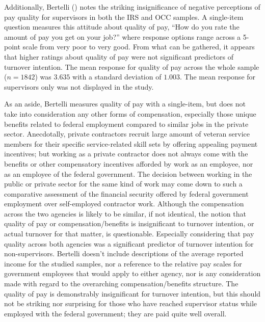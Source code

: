 \documentclass[
  11pt,
  a4paper,
]{article}
\begin{document}
Additionally, Bertelli () notes the
striking insignificance of negative perceptions of pay quality for
supervisors in both the IRS and OCC samples. A single-item question
measures this attitude about quality of pay, ``How do you rate the
amount of pay you get on your job?'' where response options range across
a 5-point scale from very poor to very good. From what can be gathered,
it appears that higher ratings about quality of pay were not significant
predictors of turnover intention. The mean response for quality of pay
across the whole sample (\(n = 1842\)) was \(3.635\) with a standard
deviation of \(1.003\). The mean response for supervisors only was not
displayed in the study.

As an aside, Bertelli measures quality of pay with a single-item, but
does not take into consideration any other forms of compensation,
especially those unique benefits related to federal employment compared
to similar jobs in the private sector. Anecdotally, private contractors
recruit large amount of veteran service members for their specific
service-related skill sets by offering appealing payment incentives; but
working as a private contractor does not always come with the benefits
or other compensatory incentives afforded by work as an employee, nor as
an employee of the federal government. The decision between working in
the public or private sector for the same kind of work may come down to
such a comparative assessment of the financial security offered by
federal government employment over self-employed contractor work.
Although the compensation across the two agencies is likely to be
similar, if not identical, the notion that quality of pay or
compensation/benefits is insignificant to turnover intention, or actual
turnover for that matter, is questionable. Especially considering that
pay quality across both agencies was a significant predictor of turnover
intention for non-supervisors. Bertelli doesn't include descriptions of
the average reported income for the studied samples, nor a reference to
the relative pay scales for government employees that would apply to
either agency, nor is any consideration made with regard to the
overarching compensation/benefits structure. The quality of pay is
demonstrably insignificant for turnover intention, but this should not
be striking nor surprising for those who have reached supervisor status
while employed with the federal government; they are paid quite well
overall.
\end{document}
